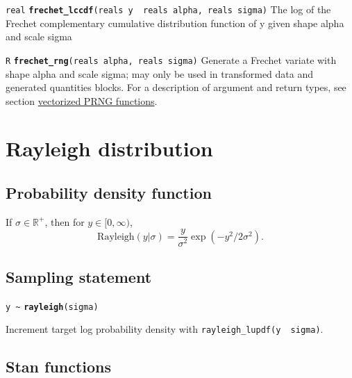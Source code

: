 \documentclass[
  10pt,
]{book}
\begin{document}

\texttt{real} \textbf{\texttt{frechet\_lccdf}}\texttt{(reals\ y\ \textbar{}\ reals\ alpha,\ reals\ sigma)}\newline
The log of the Frechet complementary cumulative distribution function
of y given shape alpha and scale sigma


\texttt{R} \textbf{\texttt{frechet\_rng}}\texttt{(reals\ alpha,\ reals\ sigma)}\newline
Generate a Frechet variate with shape alpha and scale sigma; may only
be used in transformed data and generated quantities blocks.
For a description of argument and return types, see section
\protect\hyperlink{prng-vectorization}{vectorized PRNG functions}.

\hypertarget{rayleigh-distribution}{%
\section{Rayleigh distribution}\label{rayleigh-distribution}}

\hypertarget{probability-density-function-17}{%
\subsection{Probability density function}\label{probability-density-function-17}}

If \(\sigma \in \mathbb{R}^+\), then for \(y \in [0,\infty)\), \[
\text{Rayleigh}(y|\sigma) = \frac{y}{\sigma^2} \exp(-y^2 / 2\sigma^2)
\!. \]

\hypertarget{sampling-statement-41}{%
\subsection{Sampling statement}\label{sampling-statement-41}}

\texttt{y\ \textasciitilde{}} \textbf{\texttt{rayleigh}}\texttt{(sigma)}

Increment target log probability density with \texttt{rayleigh\_lupdf(y\ \textbar{}\ sigma)}.

\hypertarget{stan-functions-40}{%
\subsection{Stan functions}\label{stan-functions-40}}
\end{document}

